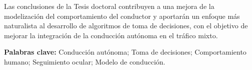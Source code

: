 Las conclusiones de la Tesis doctoral contribuyen a una mejora de la modelización del comportamiento del conductor y aportarán un enfoque más naturalista al desarrollo de algoritmos de toma de decisiones, con el objetivo de mejorar la integración de la conducción autónoma en el tráfico mixto.


\vspace{10pt}
\textbf{Palabras clave:} Conducción autónoma; Toma de decisiones; Comportamiento humano; Seguimiento ocular; Modelo de conducción.

